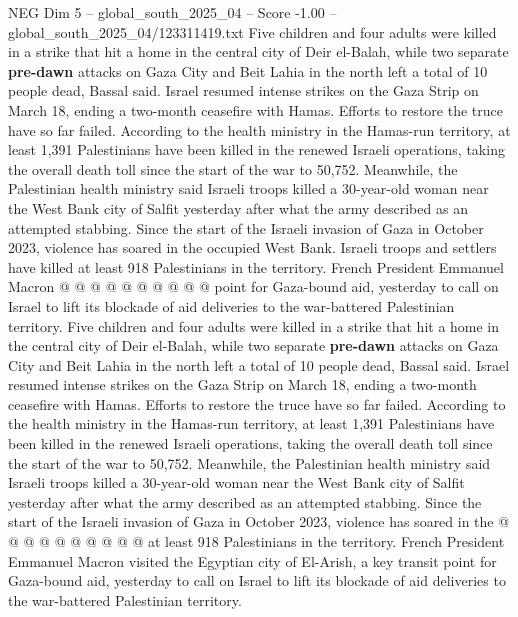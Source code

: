 \begin{textsample}{NEG Dim 5 – global\_south\_2025\_04 – Score -1.00 – global\_south\_2025\_04/123311419.txt}  \label{ex:f5_neg_362}
Five children and four adults were killed in a strike that hit a home in the central city of Deir el-Balah, while two separate \textbf{pre-dawn} attacks on Gaza City and Beit Lahia in the north left a total of 10 people dead, Bassal said.
Israel resumed intense strikes on the Gaza Strip on March 18, ending a two-month ceasefire with Hamas.
Efforts to restore the truce have so far failed.
According to the health ministry in the Hamas-run territory, at least 1,391 Palestinians have been killed in the renewed Israeli operations, taking the overall death toll since the start of the war to 50,752.
Meanwhile, the Palestinian health ministry said Israeli troops killed a 30-year-old woman near the West Bank city of Salfit yesterday after what the army described as an attempted stabbing.
Since the start of the Israeli invasion of Gaza in October 2023, violence has soared in the occupied West Bank.
Israeli troops and settlers have killed at least 918 Palestinians in the territory.
French President Emmanuel Macron @ @ @ @ @ @ @ @ @ @ point for Gaza-bound aid, yesterday to call on Israel to lift its blockade of aid deliveries to the war-battered Palestinian territory.
Five children and four adults were killed in a strike that hit a home in the central city of Deir el-Balah, while two separate \textbf{pre-dawn} attacks on Gaza City and Beit Lahia in the north left a total of 10 people dead, Bassal said.
Israel resumed intense strikes on the Gaza Strip on March 18, ending a two-month ceasefire with Hamas.
Efforts to restore the truce have so far failed.
According to the health ministry in the Hamas-run territory, at least 1,391 Palestinians have been killed in the renewed Israeli operations, taking the overall death toll since the start of the war to 50,752.
Meanwhile, the Palestinian health ministry said Israeli troops killed a 30-year-old woman near the West Bank city of Salfit yesterday after what the army described as an attempted stabbing.
Since the start of the Israeli invasion of Gaza in October 2023, violence has soared in the @ @ @ @ @ @ @ @ @ @ at least 918 Palestinians in the territory.
French President Emmanuel Macron visited the Egyptian city of El-Arish, a key transit point for Gaza-bound aid, yesterday to call on Israel to lift its blockade of aid deliveries to the war-battered Palestinian territory.

\end{textsample}
